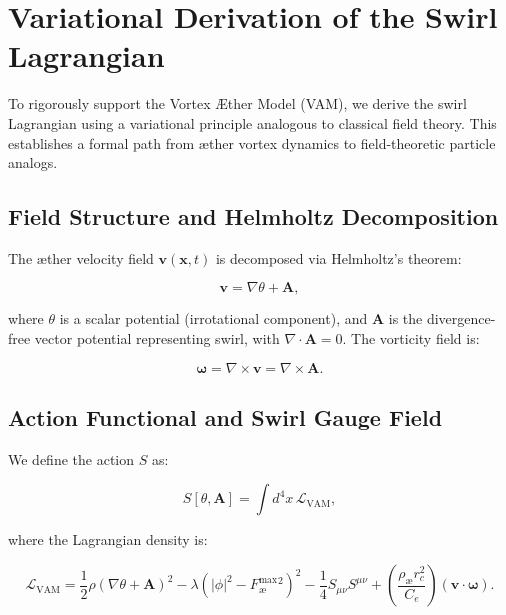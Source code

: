 \section{Variational Derivation of the Swirl Lagrangian}

To rigorously support the Vortex \AE{}ther Model (VAM), we derive the swirl Lagrangian using a variational principle analogous to classical field theory. This establishes a formal path from \ae{}ther vortex dynamics to field-theoretic particle analogs.

\subsection{Field Structure and Helmholtz Decomposition}

The \ae{}ther velocity field $\mathbf{v}(\mathbf{x}, t)$ is decomposed via Helmholtz's theorem:

\begin{equation}
\mathbf{v} = \nabla \theta + \mathbf{A},
\end{equation}

where $\theta$ is a scalar potential (irrotational component), and $\mathbf{A}$ is the divergence-free vector potential representing swirl, with $\nabla \cdot \mathbf{A} = 0$. The vorticity field is:

\begin{equation}
\boldsymbol{\omega} = \nabla \times \mathbf{v} = \nabla \times \mathbf{A}.
\end{equation}

\subsection{Action Functional and Swirl Gauge Field}

We define the action $S$ as:

\begin{equation}
S[\theta, \mathbf{A}] = \int d^4x \, \mathcal{L}_{\text{VAM}},
\end{equation}

where the Lagrangian density is:

\begin{equation}
\mathcal{L}_{\text{VAM}} = \frac{1}{2} \rho (\nabla \theta + \mathbf{A})^2 - \lambda (|\phi|^2 - F^{\text{max}}_{\text{\ae}}^2)^2 - \frac{1}{4} S_{\mu\nu} S^{\mu\nu} + \left( \frac{\rho_{\text{\ae}} r_c^2}{C_e} \right) (\mathbf{v} \cdot \boldsymbol{\omega}).
\end{equation}

